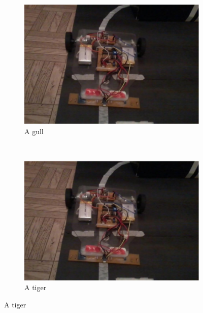 \begin{figure}
    \centering
    \begin{subfigure}[b]{0.3\textwidth}
        \includegraphics[width=\textwidth]{figuras/allan.png}
        \caption{A gull}
        \label{fig:gull}
    \end{subfigure}
    ~ %
    \begin{subfigure}[b]{0.3\textwidth}
        \includegraphics[width=\textwidth]{figuras/allan.png}
        \caption{A tiger}
        \label{fig:tiger}
    \end{subfigure}
    

\end{figure}
